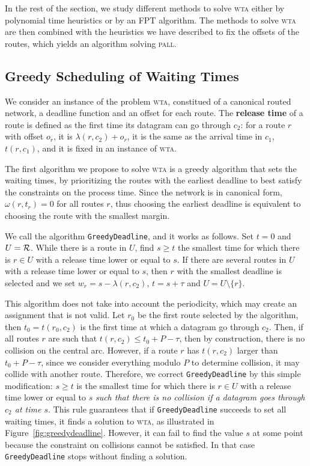 \documentclass[a4paper,10pt]{journal}
\newcommand\greedydeadline{\texttt{GreedyDeadline}\xspace}
\newcommand\pall{\textsc{pall}\xspace}
\newcommand\wta{\textsc{wta}\xspace}
\begin{document}
   In the rest of the section, we study different methods to solve \wta either by polynomial time heuristics or by an FPT algorithm. The methods to solve \wta are then combined with the heuristics we have described to fix the offsets of the routes, which yields an algorithm solving \pall.  
   
   \subsection{Greedy Scheduling of Waiting Times}

   We consider an instance of the problem \wta, constitued of a canonical routed network, a deadline function and an offset for each route. The \textbf{release time} of a route is defined as the first time its datagram can go through $c_2$: for a route $r$ with offset $o_r$, it is $\lambda(r,c_2) + o_r$, it is the same as the arrival time in $c_1$, $t(r,c_1)$, and it is fixed in an instance of \wta.

    The first algorithm we propose to solve \wta is a greedy algorithm that sets the waiting times, by prioritizing the routes with the earliest deadline to best satisfy the constraints on the process time. Since the network is in canonical form, $\omega(r,t_r) = 0$ for all routes $r$, thus choosing the earliest deadline is equivalent to choosing the route with the smallest margin.
    
    We call the algorithm \greedydeadline, and it works as follows. Set $t=0$ and $U = \cal{R}$. While there is a route in $U$, find $s \geq t$ the smallest time for which there is $r \in U$ with a release time lower or equal to $s$. If there are several routes in $U$ with a release time lower or equal to $s$, then $r$ with the smallest deadline is selected and we set $w_r = s - \lambda(r,c_2)$, $t = s + \tau$ and $ U = U \setminus \{r\}$.

    This algorithm does not take into account the periodicity, which may create an assignment that is not valid. Let $r_0$ be the first route selected by the algorithm, then $t_0 = t(r_0,c_2)$ is the first time at which a datagram go through $c_2$.
	Then, if all routes $r$ are such that $t(r, c_2) \leq t_0 + P - \tau$, 
	then by construction, there is no collision on the central arc.
      However, if a route $r$ has $t(r, c_2)$ larger than $t_0 + P - \tau$, since we consider everything modulo $P$ to determine collision, it may collide with another route. Therefore, we correct \greedydeadline by this simple modification: $s \geq t$ is the smallest time for which there is $r \in U$ with a release time lower or equal to $s$ \emph{such that there is no collision if a datagram goes through $c_2$ at time $s$}. This rule guarantees that if \greedydeadline succeeds to set all waiting times, it finds a solution to \wta, as illustrated in Figure~\ref{fig:greedydeadline}. However, it can fail to find the value $s$ at some point because the constraint on collisions cannot be satisfied. In that case \greedydeadline stops without finding a solution.
    
\end{document}

